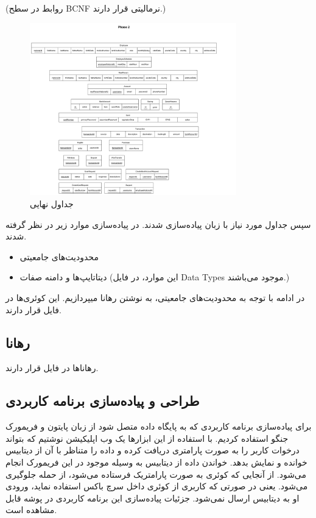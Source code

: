 \documentclass{article}
\begin{document}
(روابط در سطح BCNF نرمالیتی قرار دارند.)

\begin{figure}[!htbp]
    \centering
    \includegraphics[width=0.8\textwidth]{../Phase 2 Modified.png}
    \caption{جداول نهایی}
    \label{fig:tables}
\end{figure}

سپس جداول مورد نیاز با زبان
پیاده‌سازی شدند. در پیاده‌سازی موارد زیر در نظر گرفته شدند. 

\begin{itemize}
    \item محدودیت‌های جامعیتی
    \item دیتاتایپ‌ها و دامنه صفات (این موارد، در فایل Data Types موجود می‌باشند.)
\end{itemize}


در ادامه با توجه به محدودیت‌های جامعیتی، به نوشتن رهانا میپردازیم. این کوئری‌ها در فایل 
قرار دارند.

\subsection{رهانا}
رهاناها در فایل 
قرار دارند.


\subsection{طراحی و پیاده‌سازی برنامه کاربردی}
برای پیاده‌سازی برنامه کاربردی که به پایگاه داده متصل شود از زبان پایتون و فریمورک جنگو استفاده کردیم. 
با استفاده از این ابزارها یک وب اپلیکیشن نوشتیم که بتواند درخوات کاربر را به صورت پارامتری دریافت کرده 
و داده را متناظر با آن از دیتابیس 
خوانده و نمایش بدهد. خواندن داده از دیتابیس به وسیله 
موجود در این فریمورک انجام می‌شود. از آنجایی که کوئری به صورت پارامتریک فرستاده می‌شود، 
از حمله 
جلوگیری می‌شود. یعنی در صورتی که کاربری از کوئری 
داخل سرچ باکس استفاده نماید، ورودی او به دیتابیس ارسال نمی‌شود. جزئیات پیاده‌سازی این برنامه کاربردی در 
پوشه 
قابل مشاهده است. 
\end{document}
